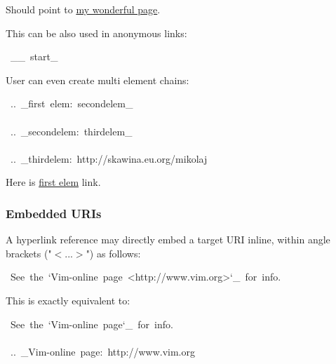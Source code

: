 \documentclass[12pt]{article}
\begin{document}
Should point to \href{http://skawina.eu.org/mikolaj}{my wonderful page}.

This can be also used in anonymous links:

\begin{ttfamily}\begin{flushleft}
\mbox{~\_\_~start\_}\\
\end{flushleft}\end{ttfamily}

User can even create multi element chains:

\begin{ttfamily}\begin{flushleft}
\mbox{~..~\_first~elem:~secondelem\_}\\
\mbox{}\\
\mbox{~..~\_secondelem:~thirdelem\_}\\
\mbox{}\\
\mbox{~..~\_thirdelem:~http://skawina.eu.org/mikolaj}\\
\end{flushleft}\end{ttfamily}

Here is \href{http://skawina.eu.org/mikolaj}{first elem} link.

\hypertarget{lembedded-uris}{}
\subsubsection{Embedded URIs}

A hyperlink reference may directly embed a target URI inline, within
angle brackets ("$<$...$>$") as follows:

\begin{ttfamily}\begin{flushleft}
\mbox{~See~the~`Vim-online~page~<http://www.vim.org>`\_~for~info.}\\
\end{flushleft}\end{ttfamily}

This is exactly equivalent to:

\begin{ttfamily}\begin{flushleft}
\mbox{~See~the~`Vim-online~page`\_~for~info.}\\
\mbox{}\\
\mbox{~..~\_Vim-online~page:~http://www.vim.org}\\
\end{flushleft}\end{ttfamily}
\end{document}
